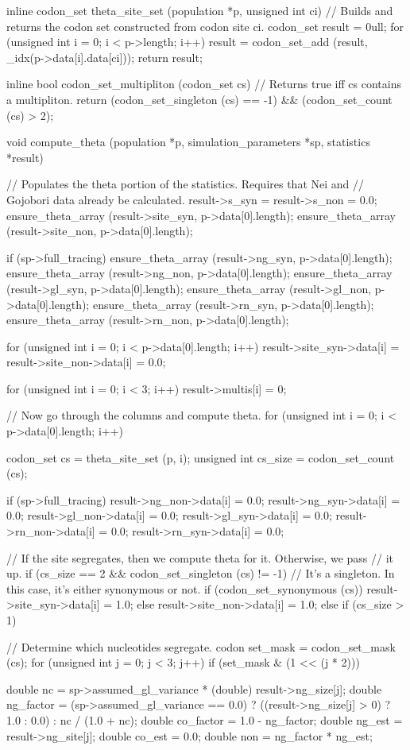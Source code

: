 \documentclass{article}
\begin{document}
\begin{ccode}
inline codon_set theta_site_set (population *p, unsigned int ci) {
  // Builds and returns the codon set constructed from codon site ci.
  codon_set result = 0ull;
  for (unsigned int i = 0; i < p->length; i++)
    result = codon_set_add (result, _idx(p->data[i].data[ci]));
  return result;
}

inline bool codon_set_multipliton (codon_set cs) {
  // Returns true iff cs contains a multipliton.
  return (codon_set_singleton (cs) == -1) && (codon_set_count (cs) > 2);
}

void compute_theta (population *p, simulation_parameters *sp, statistics *result) {
  // Populates the theta portion of the statistics. Requires that Nei and
  // Gojobori data already be calculated.
  result->s_syn = result->s_non = 0.0;
  ensure_theta_array (result->site_syn, p->data[0].length);
  ensure_theta_array (result->site_non, p->data[0].length);

  if (sp->full_tracing) {
    ensure_theta_array (result->ng_syn, p->data[0].length);
    ensure_theta_array (result->ng_non, p->data[0].length);
    ensure_theta_array (result->gl_syn, p->data[0].length);
    ensure_theta_array (result->gl_non, p->data[0].length);
    ensure_theta_array (result->rn_syn, p->data[0].length);
    ensure_theta_array (result->rn_non, p->data[0].length);
  }

  for (unsigned int i = 0; i < p->data[0].length; i++)
    result->site_syn->data[i] = result->site_non->data[i] = 0.0;

  for (unsigned int i = 0; i < 3; i++)
    result->multis[i] = 0;

  // Now go through the columns and compute theta.
  for (unsigned int i = 0; i < p->data[0].length; i++) {
    codon_set cs       	 = theta_site_set (p, i);
    unsigned int cs_size = codon_set_count (cs);

    if (sp->full_tracing) {
      result->ng_non->data[i]   = 0.0;
      result->ng_syn->data[i]   = 0.0;
      result->gl_non->data[i]   = 0.0;
      result->gl_syn->data[i]   = 0.0;
      result->rn_non->data[i]   = 0.0;
      result->rn_syn->data[i]   = 0.0;
    }

    // If the site segregates, then we compute theta for it. Otherwise, we pass
    // it up.
    if (cs_size == 2 && codon_set_singleton (cs) != -1) {
      // It’s a singleton. In this case, it’s either synonymous or not.
      if (codon_set_synonymous (cs))
	result->site_syn->data[i] = 1.0;
      else
	result->site_non->data[i] = 1.0;
    } else if (cs_size > 1) {
      // Determine which nucleotides segregate.
      codon set_mask = codon_set_mask (cs);
      for (unsigned int j = 0; j < 3; j++)
	if (set_mask & (1 << (j * 2))) {
	  double nc        = sp->assumed_gl_variance * (double) result->ng_size[j];
	  double ng_factor = (sp->assumed_gl_variance == 0.0) ?
			     ((result->ng_size[j] > 0) ? 1.0 : 0.0) :
			     nc / (1.0 + nc);
	  double co_factor = 1.0 - ng_factor;
	  double ng_est    = result->ng_site[j];
	  double co_est    = 0.0;
	  double non       = ng_factor * ng_est;

}}}}
\end{ccode}
\end{document}

